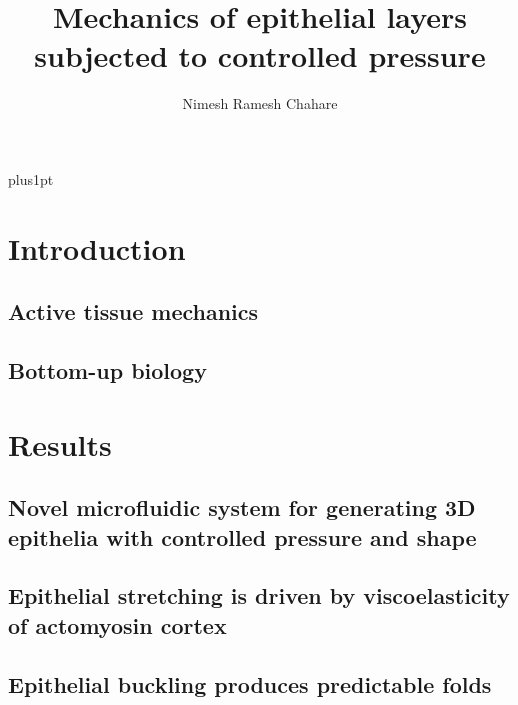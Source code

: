 \documentclass[12pt]{ociamthesis}  %
\title{Mechanics of epithelial layers subjected to controlled pressure}
\author{Nimesh Ramesh Chahare}
\begin{document}
\baselineskip=18pt plus1pt

\setcounter{secnumdepth}{3}
\setcounter{tocdepth}{3}


\maketitle                  %

\begin{romanpages}          %
\tableofcontents            %
\listoffigures              %
\end{romanpages}            %

\part{Introduction}



\chapter{Active tissue mechanics}
\chapter{Bottom-up biology}

\part{Results}
\chapter{Novel microfluidic system for generating 3D epithelia with controlled pressure and shape}
\chapter{Epithelial stretching is driven by viscoelasticity of actomyosin cortex}
\chapter{Epithelial buckling produces predictable folds}
\end{document}
